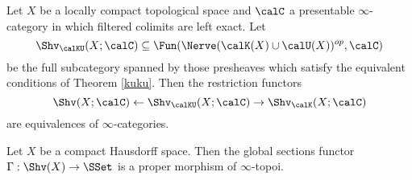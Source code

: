 \begin{corollary}\label{streeem}
Let $X$ be a locally compact topological space and $\calC$ a presentable $\infty$-category in which filtered colimits are left exact. Let
$$\Shv_{\calKU}(X;\calC) \subseteq \Fun(\Nerve (\calK(X) \cup \calU(X))^{op}, \calC)$$
be the full subcategory spanned by those presheaves which satisfy the equivalent conditions of Theorem \ref{kuku}. Then the restriction functors $$ \Shv(X;\calC) \leftarrow \Shv_{\calKU}(X;\calC) \rightarrow \Shv_{\calK}(X;\calC)$$
are equivalences of $\infty$-categories.
\end{corollary}

\begin{corollary}\label{compactprop}
Let $X$ be a compact Hausdorff space. Then the global sections functor
$\Gamma: \Shv(X) \rightarrow \SSet$ is a proper morphism of $\infty$-topoi.
\end{corollary}

